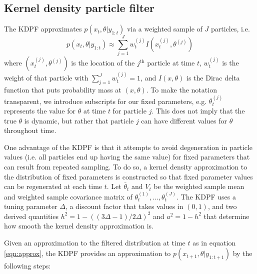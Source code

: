 \documentclass{article}
\begin{document}
\subsection{Kernel density particle filter \label{sec:kd}}

The KDPF approximates $p(x_t,\theta| y_{1:t})$ via a weighted sample of $J$ particles, i.e.
\begin{equation}
p(x_t,\theta| y_{1:t}) \approx \sum_{j=1}^J w_t^{(j)} I\left(x_t^{(j)},\theta^{(j)}\right) \label{eqn:approx}
\end{equation}
where $\left(x_t^{(j)},\theta^{(j)}\right)$ is the location of the $j^{\mbox{th}}$ particle at time $t$, $w_t^{(j)}$ is the weight of that particle with $\sum_{j=1}^J w_t^{(j)}=1$, and $I(x,\theta)$ is the Dirac delta function that puts probability mass at $(x, \theta)$. To make the notation transparent, we introduce subscripts for our fixed parameters, e.g. $\theta_t^{(j)}$ represents the value for $\theta$ at time $t$ for particle $j$. This does not imply that the true $\theta$ is dynamic, but rather that particle $j$ can have different values for $\theta$ throughout time.

One advantage of the KDPF is that it attempts to avoid degeneration in particle values (i.e. all particles end up having the same value) for fixed parameters that can result from repeated sampling. To do so, a kernel density approximation to the distribution of fixed parameters is constructed so that fixed parameter values can be regenerated at each time $t$. Let $\bar{\theta}_t$ and $V_t$ be the weighted sample mean and weighted sample covariance matrix of $\theta_t^{(1)},\ldots,\theta_t^{(J)}$.  The KDPF uses a tuning parameter $\Delta$, a discount factor that takes values in $(0,1)$, and two derived quantities $h^2 = 1 - ((3\Delta - 1)/2\Delta)^2$ and $a^2 = 1 - h^2$ that determine how smooth the kernel density approximation is.

Given an approximation to the filtered distribution at time $t$ as in equation \ref{eqn:approx}, the KDPF provides an approximation to $p(x_{t+1},\theta|y_{1:t+1})$ by the following steps:
\end{document}
